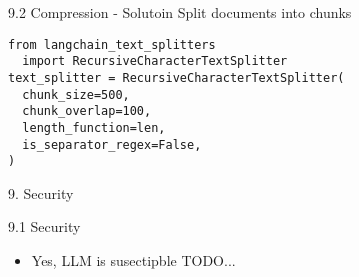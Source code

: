 \documentclass{beamer}
\begin{document}
\begin{frame}[fragile]{9.2 Compression - Solutoin}
Split documents into chunks
\begin{verbatim}
from langchain_text_splitters
  import RecursiveCharacterTextSplitter
text_splitter = RecursiveCharacterTextSplitter(
  chunk_size=500,
  chunk_overlap=100,
  length_function=len,
  is_separator_regex=False,
)
\end{verbatim}
\end{frame}

\begin{frame}{9. Security}
\end{frame}

\begin{frame}{9.1 Security}
  \begin{itemize}
    \item Yes, LLM is susectipble TODO...
  \end{itemize}
\end{frame}
\end{document}
